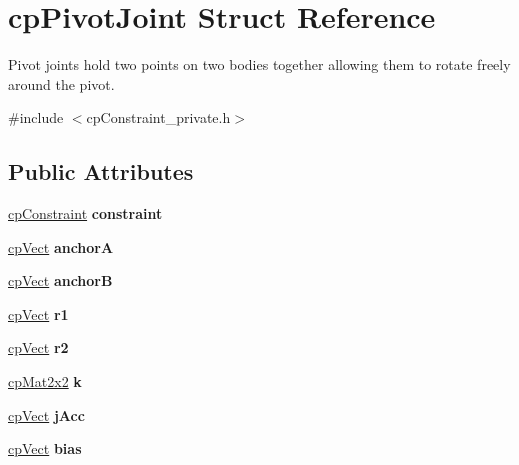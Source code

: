 \hypertarget{structcp_pivot_joint}{}\section{cp\+Pivot\+Joint Struct Reference}
\label{structcp_pivot_joint}


Pivot joints hold two points on two bodies together allowing them to rotate freely around the pivot.  




{\ttfamily \#include $<$cp\+Constraint\+\_\+private.\+h$>$}

\subsection*{Public Attributes}
\begin{DoxyCompactItemize}
\item 
\hypertarget{structcp_pivot_joint_af1cac6b4862609255538a932e1ef380a}{}\hyperlink{structcp_constraint}{cp\+Constraint} {\bfseries constraint}\label{structcp_pivot_joint_af1cac6b4862609255538a932e1ef380a}

\item 
\hypertarget{structcp_pivot_joint_af2cdd0e3055287b4d416a4dabc732406}{}\hyperlink{structcp_vect}{cp\+Vect} {\bfseries anchor\+A}\label{structcp_pivot_joint_af2cdd0e3055287b4d416a4dabc732406}

\item 
\hypertarget{structcp_pivot_joint_a27c40ef45bffe971b3b80a7a5ed157c8}{}\hyperlink{structcp_vect}{cp\+Vect} {\bfseries anchor\+B}\label{structcp_pivot_joint_a27c40ef45bffe971b3b80a7a5ed157c8}

\item 
\hypertarget{structcp_pivot_joint_aa79b763321f06525109ab43363fd6c61}{}\hyperlink{structcp_vect}{cp\+Vect} {\bfseries r1}\label{structcp_pivot_joint_aa79b763321f06525109ab43363fd6c61}

\item 
\hypertarget{structcp_pivot_joint_af50465e6c92e3c6b155698c80dcd24fd}{}\hyperlink{structcp_vect}{cp\+Vect} {\bfseries r2}\label{structcp_pivot_joint_af50465e6c92e3c6b155698c80dcd24fd}

\item 
\hypertarget{structcp_pivot_joint_a8e1a177d020a33f2b27ca1c5f76aeb4a}{}\hyperlink{structcp_mat2x2}{cp\+Mat2x2} {\bfseries k}\label{structcp_pivot_joint_a8e1a177d020a33f2b27ca1c5f76aeb4a}

\item 
\hypertarget{structcp_pivot_joint_a5fdaa4d61cf4fff7f2b5486135dec8f0}{}\hyperlink{structcp_vect}{cp\+Vect} {\bfseries j\+Acc}\label{structcp_pivot_joint_a5fdaa4d61cf4fff7f2b5486135dec8f0}

\item 
\hypertarget{structcp_pivot_joint_acf18bcfb9c42364240853413b6b16b51}{}\hyperlink{structcp_vect}{cp\+Vect} {\bfseries bias}\label{structcp_pivot_joint_acf18bcfb9c42364240853413b6b16b51}

\end{DoxyCompactItemize}


